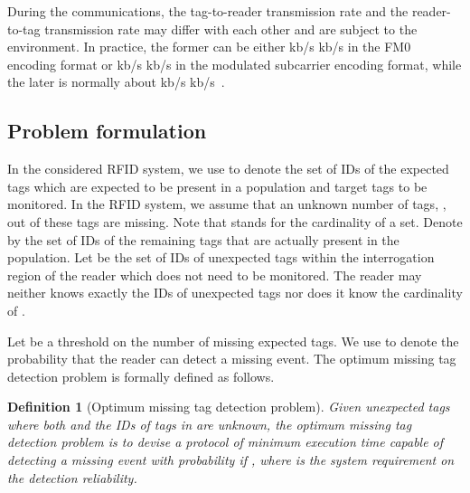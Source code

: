 \documentclass[10pt, twocolumn]{IEEEtran}
\newtheorem{definition}{Definition}
\begin{document}
During the communications, the tag-to-reader transmission rate and the reader-to-tag transmission rate may differ with each other and are subject to the environment. In practice, the former can be either kb/s  kb/s in the FM0 encoding format or kb/s  kb/s in the modulated subcarrier encoding format, while the later is normally about kb/s  kb/s~\cite{C1G22005}.

\subsection{Problem formulation}

In the considered RFID system, we use  to denote the set of IDs of the expected tags which are expected to be present in a population and target tags to be monitored. In the RFID system, we assume that an unknown number of tags, , out of these  tags are missing. Note that  stands for the cardinality of a set. Denote by  the set of IDs of the remaining  tags that are actually present in the population. Let  be the set of IDs of unexpected tags within the interrogation region of the reader which does not need to be monitored. The reader may neither knows exactly the IDs of unexpected tags nor does it know the cardinality of .

Let  be a threshold on the number of missing expected tags.
We use  to denote the probability that the reader can detect a missing event. The optimum missing tag detection problem is formally defined as follows.
\begin{definition}[Optimum missing tag detection problem]
Given  unexpected tags where both  and the IDs of tags in  are unknown, the optimum missing tag detection problem is to devise a protocol of minimum execution time capable of detecting a missing event with probability  if , where  is the system requirement on the detection reliability.
\end{definition}
\end{document}
